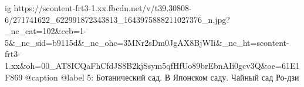  
 
 
 
 

\ifcmt
  ig https://scontent-frt3-1.xx.fbcdn.net/v/t39.30808-6/271741622_622991872343813_1643975888211027376_n.jpg?_nc_cat=102&ccb=1-5&_nc_sid=b9115d&_nc_ohc=3MNr2sDm0JgAX8BjWIi&_nc_ht=scontent-frt3-1.xx&oh=00_AT8ICQaFhCfdJS8B2kjSsym5qfHfUo89brEbnAIi0gcv3Q&oe=61E1F869
  @caption @label 5: Ботанический сад. В Японском саду. Чайный сад Ро-дзи
\fi
